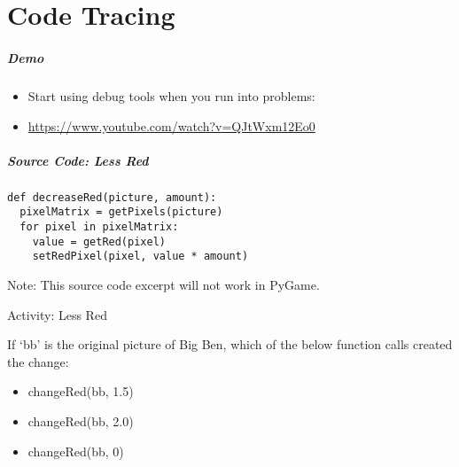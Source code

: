 \part{Code Tracing}
\frame{\partpage}

\begin{frame}
\frametitle{Demo}

\begin{itemize}		
	\item Start using debug tools when you run into problems:
	\item \url{https://www.youtube.com/watch?v=QJtWxm12Eo0}
\end{itemize}
\end{frame}

\begin{frame}[fragile]
	\frametitle{Source Code: Less Red}
	
\begin{lstlisting}
def decreaseRed(picture, amount):
  pixelMatrix = getPixels(picture)
  for pixel in pixelMatrix:
    value = getRed(pixel)
    setRedPixel(pixel, value * amount)
\end{lstlisting}

Note: This source code excerpt will not work in PyGame.

\end{frame}


\begin{frame}{Activity: Less Red}
	\vspace{2em}
	
	If `bb' is the original picture of Big Ben, which of the below function calls created the change:
	
	\begin{itemize}
		\item changeRed(bb, 1.5)
		\item changeRed(bb, 2.0)
		\item changeRed(bb, 0)
	\end{itemize}
\end{frame}